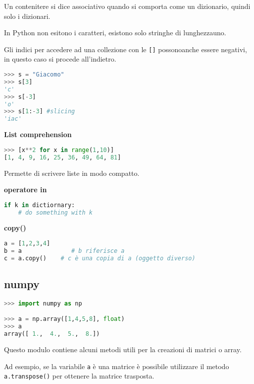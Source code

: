 Un contenitere si dice associativo quando si comporta come un
dizionario, quindi solo i dizionari.

In Python non esitono i caratteri, esistono solo stringhe di lunghezzauno.

Gli indici per accedere ad una collezione con le \texttt{{[}{]}} possonoanche essere negativi, in questo caso si procede all'indietro.

\begin{lstlisting}[language=Python, caption=Indici delle liste]
>>> s = "Giacomo"
>>> s[3]
'c'
>>> s[-3]
'o'
>>> s[1:-3] #slicing
'iac'
\end{lstlisting}


\textbf{List comprehension}

\begin{lstlisting}[language=Python, caption=List comprehension]
>>> [x**2 for x in range(1,10)]
[1, 4, 9, 16, 25, 36, 49, 64, 81]
\end{lstlisting}

Permette di scrivere liste in modo compatto.

\textbf{operatore in}

\begin{lstlisting}[language=Python, caption=Utilizzo di in]
if k in dictiornary:
    # do something with k
\end{lstlisting}

\textbf{copy()}

\begin{lstlisting}[language=Python]
a = [1,2,3,4]
b = a              # b riferisce a 
c = a.copy()    # c è una copia di a (oggetto diverso)
\end{lstlisting}

\subsection{numpy}\label{numpy}

\begin{lstlisting}[language=Python, caption=Numpy]
>>> import numpy as np

>>> a = np.array([1,4,5,8], float)
>>> a
array([ 1.,  4.,  5.,  8.])
\end{lstlisting}

Questo modulo contiene alcuni metodi utili per la creazioni di matrici o
array.

Ad esempio, se la variabile \texttt{a} è una matrice è possibile utilizzare il metodo \texttt{a.transpose()} per ottenere la matrice trasposta.

